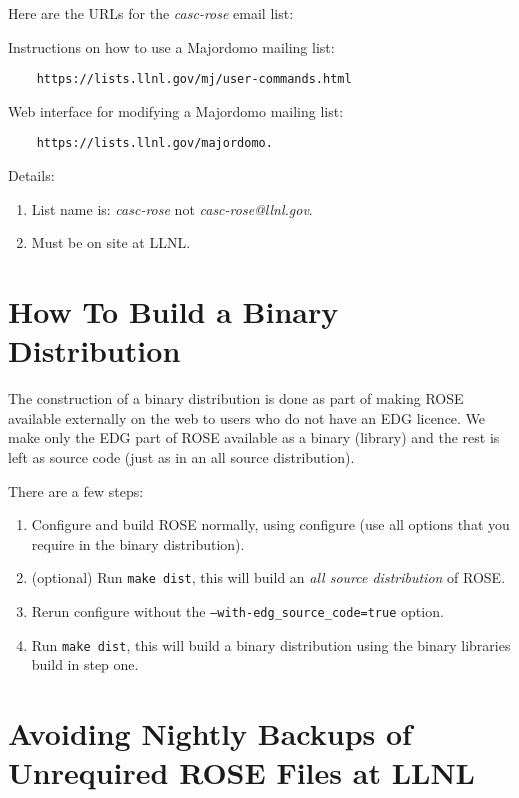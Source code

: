 Here are the URLs for the {\em casc-rose} email list:

Instructions on how to use a Majordomo mailing list: \\
\begin{verbatim}
    https://lists.llnl.gov/mj/user-commands.html
\end{verbatim}

Web interface for modifying a Majordomo mailing list: \\
\begin{verbatim}
    https://lists.llnl.gov/majordomo.
\end{verbatim}

Details: \\
\begin{enumerate}
   \item List name is: {\em casc-rose} not {\em casc-rose@llnl.gov}.
   \item Must be on site at LLNL.
\end{enumerate}


\section{How To Build a Binary Distribution}

   The construction of a binary distribution is done as part of making
ROSE available externally on the web to users who do not have an EDG
licence.  We make only the EDG part of ROSE available as a binary (library) 
and the rest is left as source code (just as in an all source distribution).

There are a few steps:
\begin{enumerate}
   \item Configure and build ROSE normally, using configure (use all options that you
    require in the binary distribution).  
   \item (optional) Run {\tt make dist}, this will build an {\em all source distribution} of ROSE.
   \item Rerun configure without the {\tt --with-edg\_source\_code=true} option.
   \item Run {\tt make dist}, this will build a binary distribution using the 
    binary libraries build in step one.

\end{enumerate}


\section{Avoiding Nightly Backups of Unrequired ROSE Files at LLNL}

